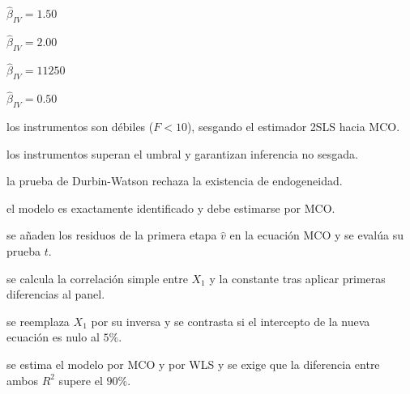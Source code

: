 \begin{opts}
    \item $\hat{\beta}_{IV} = 1.50$
    \item $\hat{\beta}_{IV} = 2.00$
    \item $\hat{\beta}_{IV} = 11250$
    \item $\hat{\beta}_{IV} = 0.50$
\end{opts}

\begin{opts}
    \item los instrumentos son débiles ($F < 10$), sesgando el estimador 2SLS hacia MCO.
    \item los instrumentos superan el umbral y garantizan inferencia no sesgada.
    \item la prueba de Durbin-Watson rechaza la existencia de endogeneidad.
    \item el modelo es exactamente identificado y debe estimarse por MCO.
\end{opts}

\begin{opts}
    \item se añaden los residuos de la primera etapa $\hat{v}$ en la ecuación MCO y se evalúa su prueba $t$.
    \item se calcula la correlación simple entre $X_1$ y la constante tras aplicar primeras diferencias al panel.
    \item se reemplaza $X_1$ por su inversa y se contrasta si el intercepto de la nueva ecuación es nulo al $5\%$.
    \item se estima el modelo por MCO y por WLS y se exige que la diferencia entre ambos $R^2$ supere el $90\%$.
\end{opts}

